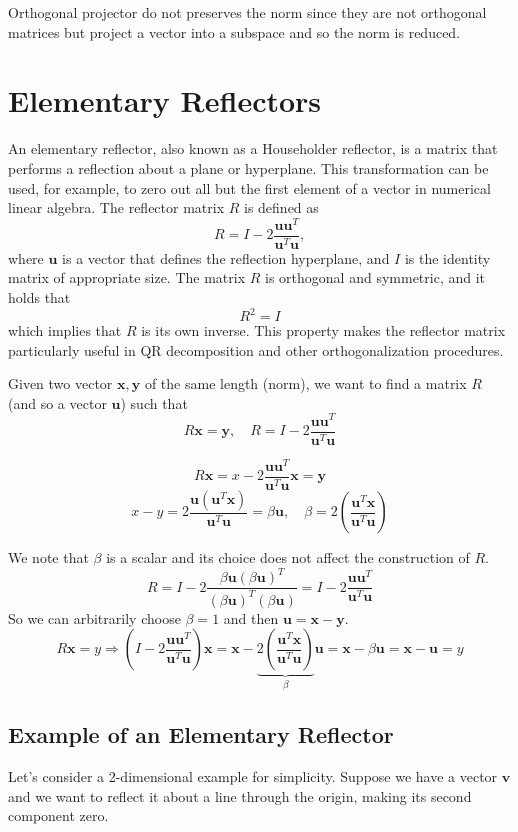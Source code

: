 Orthogonal projector do not preserves the norm since they are not orthogonal matrices
but project a vector into a subspace and so the norm is reduced.

\section{Elementary Reflectors}

An elementary reflector, also known as a Householder reflector, is a matrix that
performs a reflection about a plane or hyperplane. This transformation can be
used, for example, to zero out all but the first element of a vector in numerical
linear algebra. The reflector matrix \( R \) is defined as
\begin{equation*}
R = I - 2\frac{\mathbf{u}\mathbf{u}^T}{\mathbf{u}^T\mathbf{u}},
\end{equation*}
where \( \mathbf{u} \) is a vector that defines the reflection hyperplane, and \( I \) is the identity matrix of appropriate size.
The matrix \( R \) is orthogonal and symmetric, and it holds that
$$R^2 = I$$ which implies that \( R \) is its own inverse.
This property makes the reflector matrix particularly useful in QR decomposition and other orthogonalization procedures.

Given two vector $\mathbf{x}, \mathbf{y}$ of the same length (norm), we want to find a matrix $R$ (and so a vector $\mathbf{u}$) such that
$$ R\mathbf{x} = \mathbf{y}, \quad R = I - 2\frac{\mathbf{u}\mathbf{u}^T}{\mathbf{u}^T\mathbf{u}} $$

$$ R\mathbf{x} = x - 2\frac{\mathbf{u}\mathbf{u}^T}{\mathbf{u}^T\mathbf{u}}\mathbf{x} = \mathbf{y} $$
$$ x- y = 2\frac{\mathbf{u}(\mathbf{u}^T\mathbf{x})}{\mathbf{u}^T\mathbf{u}} = \beta \mathbf{u}, \quad \beta = 2\left(\frac{\mathbf{u}^T\mathbf{x}}{\mathbf{u}^T\mathbf{u}}\right)$$

We note that $\beta$ is a scalar and its choice does not affect the construction of $R$.
$$ R = I - 2 \frac{\beta \mathbf{u}(\beta \mathbf{u})^T}{(\beta \mathbf{u})^T (\beta \mathbf{u})} = I - 2 \frac{\mathbf{u}\mathbf{u}^T}{\mathbf{u}^T\mathbf{u}} $$
So we can arbitrarily choose $\beta = 1$ and then $\mathbf{u} = \mathbf{x} - \mathbf{y}$.
$$ R\mathbf{x} = y \Rightarrow (I - 2 \frac{\mathbf{u}\mathbf{u}^T}{\mathbf{u}^T\mathbf{u}})\mathbf{x} = \mathbf{x} - \underbrace{2\left(\frac{\mathbf{u}^T\mathbf{x}}{\mathbf{u}^T\mathbf{u}}\right)}_{\beta}\mathbf{u} = \mathbf{x} - \beta \mathbf{u} = \mathbf{x} - \mathbf{u} = y $$
\subsection*{Example of an Elementary Reflector}
Let's consider a 2-dimensional example for simplicity. Suppose we have a vector
\( \mathbf{v} \) and we want to reflect it about a line through the origin, making its second component zero.

